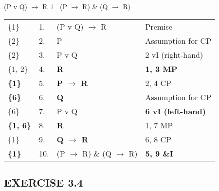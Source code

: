 \documentclass[a4paper,12pt]{article}
\newcommand{\ra}{$\rightarrow$ }
\newcommand{\vd}{$\vdash$ }
\begin{document}
    \begin{enumerate}[label=\arabic*,leftmargin=*]

        \begin{minipage}{\textwidth}
        \item (P v Q) \ra R \vd (P \ra R) \& (Q \ra R)
            \nopagebreak
            \vspace{1em}\\
            \begin{tabular}{l l l l}
                \{1\} & 1. & (P v Q) \ra R & Premise\\
                \{2\} & 2. & P & Assumption for CP\\
                \{2\} & 3. & P v Q & 2 vI (right-hand)\\
                \{1, 2\} & 4. & \textbf{R} & \textbf{1, 3 MP} \\
                \textbf{\{1\}} & 5. & \textbf{P \ra R} & 2, 4 CP \\
                \textbf{\{6\}} & 6. & \textbf{Q} & Assumption for CP \\
                \{6\} & 7. & P v Q & \textbf{6 vI (left-hand)} \\
                \textbf{\{1, 6\}} & 8. & \textbf{R} & 1, 7 MP \\
                \{1\} & 9. & \textbf{Q \ra R} & 6, 8 CP \\
                \textbf{\{1\}} & 10. & (P \ra R) \& (Q \ra R) & \textbf{5, 9 \&I} \\
            \end{tabular}
        \end{minipage}

    \end{enumerate}

    \subsection*{EXERCISE 3.4}
\end{document}

